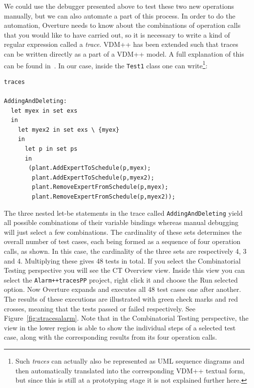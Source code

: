 We could use the debugger presented above to test these two new 
operations manually, but we can also automate a part of this process.
In order to do the automation, Overture needs to know about the
combinations of operation calls that you would like to have carried
out, so it is necessary to write a kind of regular expression called a
\emph{trace}. VDM++ has been extended such that traces can be written
directly as a part of a VDM++ model. A full explanation of this can be
found in~\cite{Larsen&09d}. In our case, inside the \texttt{Test1}
class one can write\footnote{Such \emph{traces} can actually also be
  represented as UML sequence diagrams and then automatically
  translated into the corresponding VDM++ textual form, but since this
is still at a prototyping stage it is not explained further here.}:

\begin{lstlisting}
traces

AddingAndDeleting: 
  let myex in set exs
  in
    let myex2 in set exs \ {myex}
    in
      let p in set ps 
      in
       (plant.AddExpertToSchedule(p,myex);
        plant.AddExpertToSchedule(p,myex2);
        plant.RemoveExpertFromSchedule(p,myex);
        plant.RemoveExpertFromSchedule(p,myex2));
\end{lstlisting}

\noindent The three nested let-be statements in the trace
called \texttt{AddingAndDeleting} yield all possible combinations of
their variable bindings whereas manual debugging will just select a
few combinations.  The cardinality of these sets determines the
overall number of test cases, each being formed as a sequence of four
operation calls, as shown. In this case, the cardinality of the three
sets are respectively 4, 3 and 4. Multiplying these gives 48 tests in total. If you
select the Combinatorial Testing perspective you will see the
\textsf{CT Overview} view. Inside this view you can select the \texttt{Alarm++tracesPP}
project, right click it and choose the \textsf{Run selected}
option. Now Overture expands and executes all 48 test cases one after
another. The results of these executions are illustrated with green
check marks and red crosses, meaning that the tests passed or failed
respectively. See Figure~\ref{fig:stracesalarm}. Note that in the
Combinatorial Testing perspective, the view in the lower region is
able to show the individual steps of a selected test case, along with
the corresponding results from its four operation calls.

